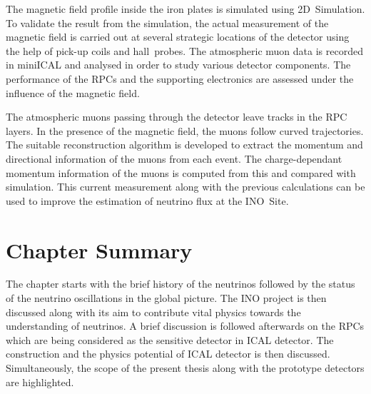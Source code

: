 The magnetic field profile inside the iron plates is simulated using
2D~Simulation. To validate the result from the simulation, the actual
measurement of the magnetic field is carried out at several strategic
locations of the detector using the help of pick-up coils and
hall~probes. The atmospheric muon data is recorded in miniICAL and
analysed in order to study various detector components. The
performance of the RPCs and the supporting electronics are assessed
under the influence of the magnetic field.

The atmospheric muons passing through the detector leave tracks in the
RPC layers. In the presence of the magnetic field, the muons follow
curved trajectories. The suitable reconstruction algorithm is
developed to extract the momentum and directional information of the
muons from each event. The charge-dependant momentum information of
the muons is computed from this and compared with simulation. This
current measurement along with the previous calculations can be used
to improve the estimation of neutrino flux at the INO~Site.

\section{Chapter Summary}
The chapter starts with the brief history of the neutrinos followed
by the status of the neutrino oscillations in the global picture. The
INO project is then discussed along with its aim to contribute vital
physics towards the understanding of neutrinos. A brief discussion is
followed afterwards on the RPCs which are being considered as the
sensitive detector in ICAL detector. The construction and the physics
potential of ICAL detector is then discussed. Simultaneously, the
scope of the present thesis along with the prototype detectors are
highlighted.
